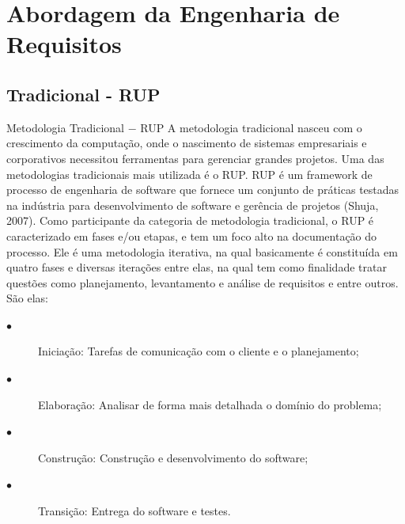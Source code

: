 \chapter{Abordagem da Engenharia de Requisitos}

\section{Tradicional - RUP}
  Metodologia Tradicional $-$ RUP
            A metodologia tradicional nasceu com o crescimento da computação, onde o nascimento de sistemas empresariais e corporativos necessitou ferramentas para gerenciar grandes projetos. Uma das metodologias tradicionais mais utilizada é o RUP.
            RUP é um framework de processo de engenharia de software que fornece um conjunto de práticas testadas na indústria para desenvolvimento de software e gerência de projetos (Shuja, 2007). Como participante da categoria de metodologia tradicional, o RUP é caracterizado em fases e/ou etapas, e tem um foco alto na documentação do processo.
            Ele é uma metodologia iterativa, na qual basicamente é constituída em quatro fases e diversas iterações entre elas, na qual tem como finalidade tratar questões como planejamento, levantamento e análise de requisitos e entre outros. São elas:
          	\begin{description}
          	\item[$\bullet$] Iniciação: Tarefas de comunicação com o cliente e o planejamento;
          	\item[$\bullet$] Elaboração: Analisar de forma mais detalhada o domínio do problema;
          	\item[$\bullet$] Construção: Construção e desenvolvimento do software;
          	\item[$\bullet$] Transição: Entrega do software e testes.
          	\end{description}
 

